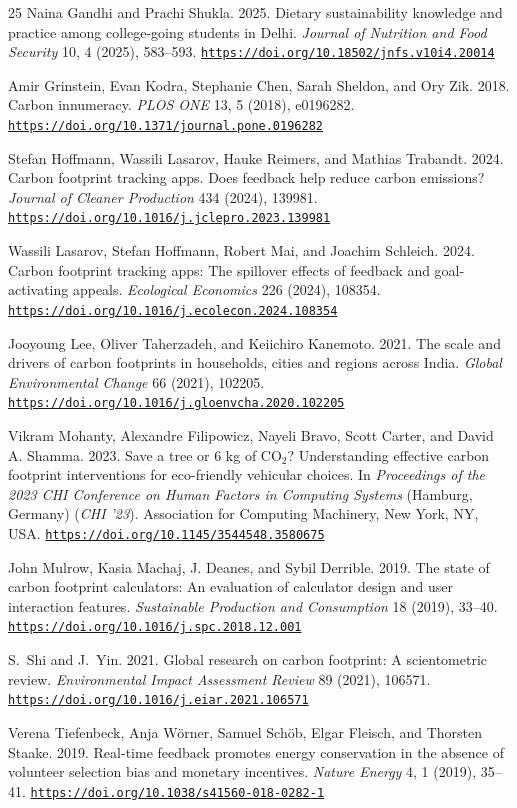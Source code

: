 \documentclass[12pt, a4paper]{article}
\newcommand{\doi}[1]{\href{https://doi.org/#1}{\nolinkurl{https://doi.org/#1}}}
\begin{document}
\begin{thebibliography}{25}
Naina Gandhi and Prachi Shukla. 2025. Dietary sustainability knowledge and practice among college-going students in Delhi. \textit{Journal of Nutrition and Food Security} 10, 4 (2025), 583--593. \doi{10.18502/jnfs.v10i4.20014}

Amir Grinstein, Evan Kodra, Stephanie Chen, Sarah Sheldon, and Ory Zik. 2018. Carbon innumeracy. \textit{PLOS ONE} 13, 5 (2018), e0196282. \doi{10.1371/journal.pone.0196282}

Stefan Hoffmann, Wassili Lasarov, Hauke Reimers, and Mathias Trabandt. 2024. Carbon footprint tracking apps. Does feedback help reduce carbon emissions? \textit{Journal of Cleaner Production} 434 (2024), 139981. \doi{10.1016/j.jclepro.2023.139981}

Wassili Lasarov, Stefan Hoffmann, Robert Mai, and Joachim Schleich. 2024. Carbon footprint tracking apps: The spillover effects of feedback and goal-activating appeals. \textit{Ecological Economics} 226 (2024), 108354. \doi{10.1016/j.ecolecon.2024.108354}

Jooyoung Lee, Oliver Taherzadeh, and Keiichiro Kanemoto. 2021. The scale and drivers of carbon footprints in households, cities and regions across India. \textit{Global Environmental Change} 66 (2021), 102205. \doi{10.1016/j.gloenvcha.2020.102205}

Vikram Mohanty, Alexandre Filipowicz, Nayeli Bravo, Scott Carter, and David A. Shamma. 2023. Save a tree or 6 kg of $\text{CO}_2$? Understanding effective carbon footprint interventions for eco-friendly vehicular choices. In \textit{Proceedings of the 2023 CHI Conference on Human Factors in Computing Systems} (Hamburg, Germany) (\textit{CHI '23}). Association for Computing Machinery, New York, NY, USA. \doi{10.1145/3544548.3580675}

John Mulrow, Kasia Machaj, J. Deanes, and Sybil Derrible. 2019. The state of carbon footprint calculators: An evaluation of calculator design and user interaction features. \textit{Sustainable Production and Consumption} 18 (2019), 33--40. \doi{10.1016/j.spc.2018.12.001}

S.~Shi and J.~Yin. 2021. Global research on carbon footprint: A scientometric review. \textit{Environmental Impact Assessment Review} 89 (2021), 106571. \doi{10.1016/j.eiar.2021.106571}

Verena Tiefenbeck, Anja W\"{o}rner, Samuel Sch\"{o}b, Elgar Fleisch, and Thorsten Staake. 2019. Real-time feedback promotes energy conservation in the absence of volunteer selection bias and monetary incentives. \textit{Nature Energy} 4, 1 (2019), 35--41. \doi{10.1038/s41560-018-0282-1}

\end{thebibliography}
\end{document}
